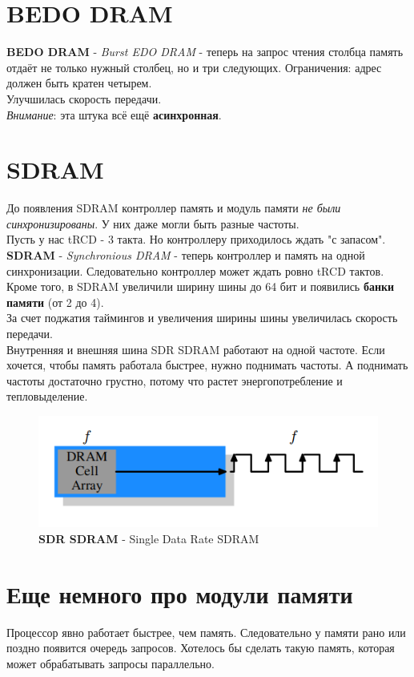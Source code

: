 \documentclass[12pt, a4paper]{article}
\begin{document}
\section{BEDO DRAM}
\textbf{BEDO DRAM} - \textit{Burst EDO DRAM} - теперь на запрос чтения столбца память отдаёт не только нужный столбец, но и три следующих. Ограничения: адрес должен быть кратен четырем.\\
Улучшилась скорость передачи.\\
\textit{Внимание}: эта штука всё ещё \textbf{асинхронная}.
\section{SDRAM}
До появления SDRAM контроллер память и модуль памяти \textit{не были синхронизированы}. У них даже могли быть разные частоты.\\
Пусть у нас tRCD - 3 такта. Но контроллеру приходилось ждать "с запасом".\\
\textbf{SDRAM} - \textit{Synchronious DRAM} - теперь контроллер и память на одной синхронизации. Следовательно контроллер может ждать ровно tRCD тактов.\\
Кроме того, в SDRAM увеличили ширину шины до 64 бит и появились \textbf{банки памяти} (от 2 до 4).\\
За счет поджатия таймингов и увеличения ширины шины увеличилась скорость передачи.\\
Внутренняя и внешняя шина SDR SDRAM работают на одной частоте. Если хочется, чтобы память работала быстрее, нужно поднимать частоты. А поднимать частоты достаточно грустно, потому что растет энергопотребление и тепловыделение.
\begin{figure}[h]
    \centering
    \includegraphics[scale=0.6]{./images/SDR_SDRAM.png}
    \caption{\textbf{SDR SDRAM} - Single Data Rate SDRAM}
    \label{fig:SDR_SDRAM}
\end{figure}
\section{Еще немного про модули памяти}
Процессор явно работает быстрее, чем память. Следовательно у памяти рано или поздно появится очередь запросов. Хотелось бы сделать такую память, которая может обрабатывать запросы параллельно.
\end{document}
